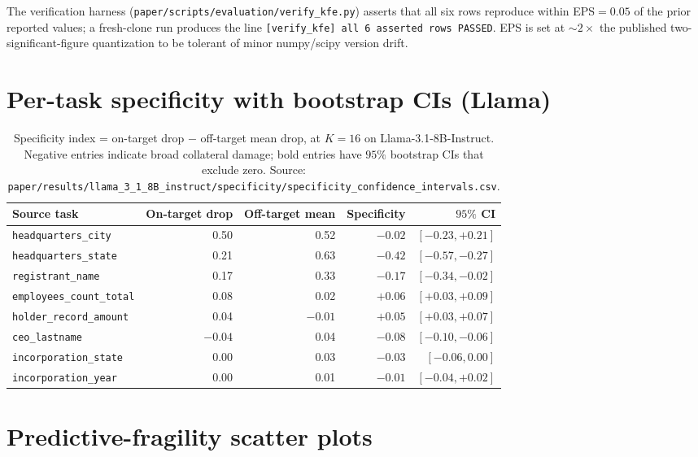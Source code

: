 \documentclass{article}
\theoremstyle{plain}
\theoremstyle{definition}
\theoremstyle{remark}
\begin{document}
The verification harness (\texttt{paper/scripts/evaluation/verify\_kfe.py}) asserts that all six rows reproduce within EPS$=0.05$ of the prior reported values; a fresh-clone run produces the line \texttt{[verify\_kfe] all 6 asserted rows PASSED}. EPS is set at $\sim 2\times$ the published two-significant-figure quantization to be tolerant of minor numpy/scipy version drift.

\section{Per-task specificity with bootstrap CIs (Llama)}
\label{app:specificity}

\begin{table}[h]
\centering
\small
\begin{tabular}{lrrrr}
\toprule
\textbf{Source task} & \textbf{On-target drop} & \textbf{Off-target mean} & \textbf{Specificity} & \textbf{$95\%$ CI} \\
\midrule
\texttt{headquarters\_city}      & 0.50  & 0.52  & $-0.02$ & $[-0.23, +0.21]$ \\
\texttt{headquarters\_state}     & 0.21  & 0.63  & $\mathbf{-0.42}$ & $[-0.57, -0.27]$ \\
\texttt{registrant\_name}        & 0.17  & 0.33  & $\mathbf{-0.17}$ & $[-0.34, -0.02]$ \\
\texttt{employees\_count\_total} & 0.08  & 0.02  & $\mathbf{+0.06}$ & $[+0.03, +0.09]$ \\
\texttt{holder\_record\_amount}  & 0.04  & $-0.01$ & $\mathbf{+0.05}$ & $[+0.03, +0.07]$ \\
\texttt{ceo\_lastname}           & $-0.04$ & 0.04 & $\mathbf{-0.08}$ & $[-0.10, -0.06]$ \\
\texttt{incorporation\_state}    & 0.00  & 0.03  & $-0.03$ & $[-0.06, 0.00]$  \\
\texttt{incorporation\_year}     & 0.00  & 0.01  & $-0.01$ & $[-0.04, +0.02]$ \\
\bottomrule
\end{tabular}
\caption{Specificity index = on-target drop $-$ off-target mean drop, at $K{=}16$ on Llama-3.1-8B-Instruct. Negative entries indicate broad collateral damage; bold entries have $95\%$ bootstrap CIs that exclude zero. Source: \texttt{paper/results/llama\_3\_1\_8B\_instruct/specificity/specificity\_confidence\_intervals.csv}.}
\label{tab:specificity}
\end{table}

\section{Predictive-fragility scatter plots}
\label{app:predict-fig}
\end{document}
